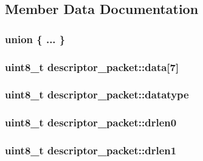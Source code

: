 \subsection{Member Data Documentation}
\hypertarget{structdescriptor__packet_a9d52a25c1b5dbc1aa92301cfbb10db97}{\subsubsection[{"@33}]{\setlength{\rightskip}{0pt plus 5cm}union \{ ... \} }}\label{structdescriptor__packet_a9d52a25c1b5dbc1aa92301cfbb10db97}
\hypertarget{structdescriptor__packet_ad0ac7e3aa5ab78a411f748ae0baed2f3}{
\subsubsection[{data}]{\setlength{\rightskip}{0pt plus 5cm}uint8\-\_\-t descriptor\-\_\-packet\-::data\mbox{[}7\mbox{]}}}\label{structdescriptor__packet_ad0ac7e3aa5ab78a411f748ae0baed2f3}
\hypertarget{structdescriptor__packet_ad1bea15d0f3741d718d82689884c787d}{
\subsubsection[{datatype}]{\setlength{\rightskip}{0pt plus 5cm}uint8\-\_\-t descriptor\-\_\-packet\-::datatype}}\label{structdescriptor__packet_ad1bea15d0f3741d718d82689884c787d}
\hypertarget{structdescriptor__packet_afaa19b5c2d3324b188e5f1b24a07c3fb}{
\subsubsection[{drlen0}]{\setlength{\rightskip}{0pt plus 5cm}uint8\-\_\-t descriptor\-\_\-packet\-::drlen0}}\label{structdescriptor__packet_afaa19b5c2d3324b188e5f1b24a07c3fb}
\hypertarget{structdescriptor__packet_a3f182b48556355988a8f983fb9dc434b}{
\subsubsection[{drlen1}]{\setlength{\rightskip}{0pt plus 5cm}uint8\-\_\-t descriptor\-\_\-packet\-::drlen1}}\label{structdescriptor__packet_a3f182b48556355988a8f983fb9dc434b}
